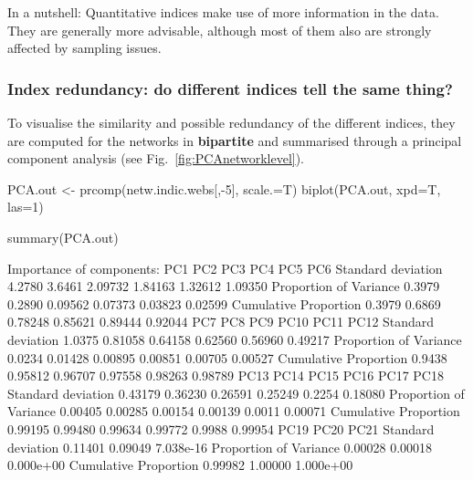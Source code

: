 \documentclass[a4paper, 11pt]{article}\usepackage[]{graphicx}\usepackage[]{color}
\newcommand{\package}[1]{\textbf{#1}}
\begin{document}
In a nutshell: Quantitative indices make use of more information in the data. They are generally more advisable, although most of them also are strongly affected by sampling issues.



\subsubsection{Index redundancy: do different indices tell the same thing?}

To visualise the similarity and possible redundancy of the different indices, they are computed for the networks in \package{bipartite} and summarised through a principal component analysis (see Fig.~\ref{fig:PCAnetworklevel}).
\begin{Schunk}
\end{Schunk}

\begin{Schunk}
\begin{Sinput}
PCA.out <- prcomp(netw.indic.webs[,-5], scale.=T)
biplot(PCA.out, xpd=T, las=1)
\end{Sinput}
\end{Schunk}
\begin{Schunk}
\begin{Sinput}
summary(PCA.out)
\end{Sinput}
\begin{Soutput}
Importance of components:
                          PC1    PC2     PC3     PC4     PC5     PC6
Standard deviation     4.2780 3.6461 2.09732 1.84163 1.32612 1.09350
Proportion of Variance 0.3979 0.2890 0.09562 0.07373 0.03823 0.02599
Cumulative Proportion  0.3979 0.6869 0.78248 0.85621 0.89444 0.92044
                          PC7     PC8     PC9    PC10    PC11    PC12
Standard deviation     1.0375 0.81058 0.64158 0.62560 0.56960 0.49217
Proportion of Variance 0.0234 0.01428 0.00895 0.00851 0.00705 0.00527
Cumulative Proportion  0.9438 0.95812 0.96707 0.97558 0.98263 0.98789
                          PC13    PC14    PC15    PC16   PC17    PC18
Standard deviation     0.43179 0.36230 0.26591 0.25249 0.2254 0.18080
Proportion of Variance 0.00405 0.00285 0.00154 0.00139 0.0011 0.00071
Cumulative Proportion  0.99195 0.99480 0.99634 0.99772 0.9988 0.99954
                          PC19    PC20      PC21
Standard deviation     0.11401 0.09049 7.038e-16
Proportion of Variance 0.00028 0.00018 0.000e+00
Cumulative Proportion  0.99982 1.00000 1.000e+00
\end{Soutput}
\end{Schunk}
\end{document}
